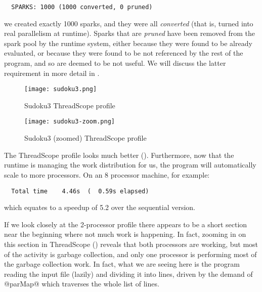 {\small \begin{verbatim}
  SPARKS: 1000 (1000 converted, 0 pruned)
\end{verbatim}}

\noindent we created exactly 1000 sparks, and they were all
\emph{converted} (that is, turned into real parallelism at runtime).
Sparks that are \emph{pruned} have been removed from the spark pool by
the runtime system, either because they were found to be already
evaluated, or because they were found to be not referenced by the rest
of the program, and so are deemed to be not useful.  We will discuss
the latter requirement in more detail in .

\begin{figure}
\begin{center}
\texttt{[image: sudoku3.png]}
\end{center}
\caption{Sudoku3 ThreadScope profile}
\label{fig:sudoku3-threadscope}
\end{figure}

\begin{figure}
\begin{center}
\texttt{[image: sudoku3-zoom.png]}
\end{center}
\caption{Sudoku3 (zoomed) ThreadScope profile}
\label{fig:sudoku3-zoom-threadscope}
\end{figure}

The ThreadScope profile looks much better
().  Furthermore, now that the runtime is
managing the work distribution for us, the program will automatically
scale to more processors.  On an 8 processor machine, for example:

{\small \begin{verbatim}
  Total time    4.46s  (  0.59s elapsed)
\end{verbatim}}

\noindent which equates to a speedup of 5.2 over the sequential
version.

If we look closely at the 2-processor profile there appears to be a
short section near the beginning where not much work is happening.  In
fact, zooming in on this section in ThreadScope
() reveals that both processors
are working, but most of the activity is garbage collection, and only
one processor is performing most of the garbage collection work.  In
fact, what we are seeing here is the program reading the input file
(lazily) and dividing it into lines, driven by the demand of @parMap@
which traverses the whole list of lines.

